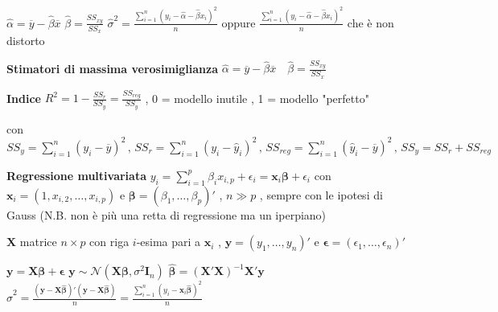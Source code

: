 \documentclass[openany]{book} %
\begin{document}
$\hat\alpha=\overline y-\hat\beta\overline x$ \quad $\hat\beta=\frac{SS_{xy}}{SS_x}$ \quad $\hat\sigma^2=\frac{\sum_{i=1}^n(y_i-\hat\alpha-\hat\beta x_i)^2}{n}$ oppure $\frac{\sum_{i=1}^n(y_i-\hat\alpha-\hat\beta x_i)^2}{n}$ che è non distorto

\textbf{Stimatori di massima verosimiglianza} $\hat\alpha =\overline y-\hat\beta\overline x \quad \hat\beta=\frac{SS_{xy}}{SS_x}$

\textbf{Indice} $R^2=1-\frac{SS_r}{SS_y}=\frac{SS_{reg}}{SS_y}$  , 0 = modello inutile , 1 = modello "perfetto"

con $SS_y = \sum_{i=1}^n(y_i-\overline y)^2\,,\,SS_r = \sum_{i=1}^n(y_i-\hat y_i)^2\,,\,SS_{reg} = \sum_{i=1}^n(\hat y_i-\overline y)^2\,,\,SS_y=SS_r+SS_{reg}$

\textbf{Regressione multivariata} $y_i=\sum_{i=1}^p\beta_i x_{i,p}+\epsilon_i = \boldsymbol{x}_i \boldsymbol{\beta}+\epsilon_i$ con $\boldsymbol{x}_i=(1,x_{i,2},\dots,x_{i,p})$ e $\boldsymbol{\beta}=(\beta_1,\dots,\beta_p)'$ , $n\gg p$ , sempre con le ipotesi di Gauss (N.B. non è più una retta di regressione ma un iperpiano)

$\boldsymbol{X}$ matrice $n\times p$ con riga $i$-esima pari a $\boldsymbol{x}_i$ , $\boldsymbol{y}=(y_1,\dots,y_n)'$ e $\boldsymbol{\epsilon}=(\epsilon_1,\dots,\epsilon_n)'$

$\boldsymbol{y}=\boldsymbol{X\beta}+\boldsymbol{\epsilon}$ \quad $\boldsymbol{y}\sim \mathcal{N}(\boldsymbol{X\beta},\sigma^2 \boldsymbol{I}_n)$ \quad $\hat {\boldsymbol{\beta}}=(\boldsymbol{X}'\boldsymbol{X})^{-1}\boldsymbol{X}'\boldsymbol{y}$ \quad $\hat\sigma^2=\frac{(\boldsymbol{y}-\boldsymbol{X}\hat {\boldsymbol{\beta}})'(\boldsymbol{y}-\boldsymbol{X}\hat {\boldsymbol{\beta}})}{n}=\frac{\sum_{i=1}^n(y_i-\boldsymbol{x}_i\hat {\boldsymbol{\beta}})^2}{n}$








\end{document}
